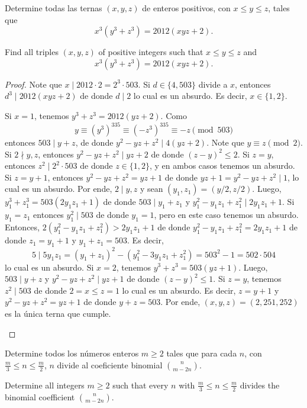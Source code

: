 \begin{probEG}[ISL 2012/N2]
  Determine todas las ternas $(x,y,z)$ de enteros positivos, con $x\le y\le z$,
  tales que
  \[x^3(y^3+z^3)=2012(xyz+2).\]
  \begin{hint}
    Find all triples $(x,y,z)$ of positive integers such that $x\le y\le z$ and
    \[x^3(y^3+z^3)=2012(xyz+2).\]
  \end{hint}
\end{probEG}

\begin{proof}
  Note que $x\mid 2012\cdot 2=2^3\cdot 503$. Si $d\in\{4,503\}$ divide a $x$,
  entonces $d^3\mid 2012(xyz+2)$ de donde $d\mid 2$ lo cual es un absurdo. Es
  decir, $x\in\{1,2\}$.
  \begin{itemize}
    \ii Si $x=1$, tenemos $y^3+z^3=2012(yz+2)$. Como
    \[
      y
      \equiv\left(y^3\right)^{335}
      \equiv\left(-z^3\right)^{335}
      \equiv -z\pmod{503}
    \]
    entonces $503\mid y+z$, de donde $y^2-yz+z^2\mid 4(yz+2)$. Note que
    $y\equiv z\pmod 2$. Si $2\nmid y,z$, entonces $y^2-yz+z^2\mid yz+2$ de donde
    $(z-y)^2\le 2$. Si $z=y$, entonces $z^2\mid 2^2\cdot 503$ de donde
    $z\in\{1,2\}$, y en ambos casos tenemos un absurdo. Si $z=y+1$, entonces
    $y^2-yz+z^2=yz+1$ de donde $yz+1=y^2-yz+z^2\mid 1$, lo cual es un absurdo.
    Por ende, $2\mid y,z$ y sean $(y_1,z_1)=(y/2,z/2)$. Luego,
    $y_1^3+z_1^3=503(2y_1z_1+1)$ de donde $503\mid y_1+z_1$ y
    $y_1^2-y_1z_1+z_1^2\mid 2y_1z_1+1$. Si $y_1=z_1$ entonces $y_1^2\mid 503$ de
    donde $y_1=1$, pero en este caso tenemos un absurdo. Entonces,
    $2(y_1^2-y_1z_1+z_1^2)>2y_1z_1+1$ de donde $y_1^2-y_1z_1+z_1^2=2y_1z_1+1$ de
    donde $z_1=y_1+1$ y $y_1+z_1=503$. Es decir,
    \[5\mid 5y_1z_1=(y_1+z_1)^2-(y_1^2-3y_1z_1+z_1^2)=503^2-1=502\cdot 504\]
    lo cual es un absurdo.
  \ii Si $x=2$, tenemos $y^3+z^3=503(yz+1)$. Luego, $503\mid y+z$ y
  $y^2-yz+z^2\mid yz+1$ de donde $(z-y)^2\le 1$. Si $z=y$, tenemos $z^2\mid 503$
  de donde $2=x\le z=1$ lo cual es un absurdo. Es decir, $z=y+1$ y
  $y^2-yz+z^2=yz+1$ de donde $y+z=503$. Por ende, $(x,y,z)=(2,251,252)$ es la
  única terna que cumple.
  \end{itemize}
\end{proof}

\begin{probEG}[ISL 2012/N3]
  Determine todos los números enteros $m\ge 2$ tales que para cada $n$, con
  $\frac m3\le n\le\frac m2$, $n$ divide al coeficiente binomial
  $\binom{n}{m-2n}$.
  \begin{hint}
    Determine all integers $m\ge 2$ such that every $n$ with
    $\frac m3\le n\le\frac m2$ divides the binomial coefficient
    $\binom{n}{m-2n}$.
  \end{hint}
\end{probEG}


